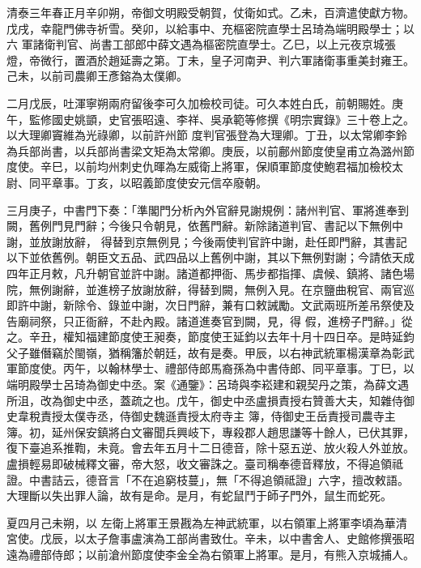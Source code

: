
\begin{pinyinscope}

 清泰三年春正月辛卯朔，帝御文明殿受朝賀，仗衛如式。乙未，百濟遣使獻方物。戊戌，幸龍門佛寺祈雪。癸卯，以給事中、充樞密院直學士呂琦為端明殿學士；以六
 軍諸衛判官、尚書工部郎中薛文遇為樞密院直學士。乙巳，以上元夜京城張燈，帝微行，置酒於趙延壽之第。丁未，皇子河南尹、判六軍諸衛事重美封雍王。己未，以前司農卿王彥鎔為太僕卿。


二月戊辰，吐渾寧朔兩府留後李可久加檢校司徒。可久本姓白氏，前朝賜姓。庚午，監修國史姚顗，史官張昭遠、李祥、吳承範等修撰《明宗實錄》三十卷上之。
 以大理卿竇維為光祿卿，以前許州節
 度判官張登為大理卿。丁丑，以太常卿李鈴為兵部尚書，以兵部尚書梁文矩為太常卿。庚辰，以前鄜州節度使皇甫立為潞州節度使。辛巳，以前均州刺史仇暉為左威衛上將軍，保順軍節度使鮑君福加檢校太尉、同平章事。丁亥，以昭義節度使安元信卒廢朝。



 三月庚子，中書門下奏：「準閣門分析內外官辭見謝規例：諸州判官、軍將進奉到闕，舊例門見門辭；今後只令朝見，依舊門辭。新除諸道判官、書記以下無例中謝，並放謝放辭，
 得替到京無例見；今後兩使判官許中謝，赴任即門辭，其書記以下並依舊例。朝臣文五品、武四品以上舊例中謝，其以下無例對謝；今請依天成四年正月敕，凡升朝官並許中謝。諸道都押衙、馬步都指揮、虞候、鎮將、諸色場院，無例謝辭，並進榜子放謝放辭，得替到闕，無例入見。在京鹽曲稅官、兩官巡即許中謝，新除令、錄並中謝，次日門辭，兼有口敕誡勵。文武兩班所差吊祭使及告廟祠祭，只正衙辭，不赴內殿。諸道進奏官到闕，見，得
 假，進榜子門辭。」從之。辛丑，權知福建節度使王昶奏，節度使王延鈞以去年十月十四日卒。是時延鈞父子雖僭竊於閩嶺，猶稱籓於朝廷，故有是奏。甲辰，以右神武統軍楊漢章為彰武軍節度使。丙午，以翰林學士、禮部侍郎馬裔孫為中書侍郎、同平章事。丁巳，以端明殿學士呂琦為御史中丞。案《通鑒》：呂琦與李崧建和親契丹之策，為薛文遇所沮，改為御史中丞，蓋疏之也。戊午，御史中丞盧損責授右贊善大夫，知雜侍御史韋稅責授太僕寺丞，侍御史魏遜責授太府寺主
 簿，侍御史王岳責授司農寺主簿。初，延州保安鎮將白文審聞兵興岐下，專殺郡人趙思謙等十餘人，已伏其罪，復下臺追系推鞫，未竟。會去年五月十二日德音，除十惡五逆、放火殺人外並放。盧損輕易即破械釋文審，帝大怒，收文審誅之。臺司稱奉德音釋放，不得追領祗證。中書詰云，德音言「不在追窮枝蔓」，無「不得追領祗證」六字，擅改敕語。大理斷以失出罪人論，故有是命。是月，有蛇鼠鬥于師子門外，鼠生而蛇死。



 夏四月己未朔，以
 左衛上將軍王景戡為左神武統軍，以右領軍上將軍李頃為華清宮使。戊辰，以太子詹事盧演為工部尚書致仕。辛未，以中書舍人、史館修撰張昭遠為禮部侍郎；以前滄州節度使李金全為右領軍上將軍。是月，有熊入京城捕人。




\end{pinyinscope}
